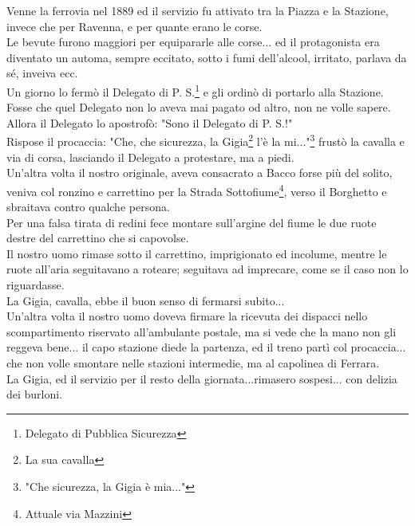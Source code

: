 Venne la ferrovia nel 1889 ed il servizio fu attivato tra la Piazza e la Stazione, invece che per Ravenna, e per quante erano le corse.\\
Le bevute furono maggiori per equipararle alle corse... ed il protagonista era diventato un automa, sempre eccitato, sotto i fumi dell'alcool, irritato, parlava da sé, inveiva ecc.\\
Un giorno lo fermò il Delegato di P. S.\footnote{Delegato di Pubblica Sicurezza} e gli ordinò di portarlo alla Stazione. Fosse che quel Delegato non lo aveva mai pagato od altro, non ne volle sapere.\\
Allora il Delegato lo apostrofò: "Sono il Delegato di P. S.!"\\
Rispose il procaccia: "Che, che sicurezza, la Gigia\footnote{La sua cavalla} l'è la mi..."\footnote{"Che sicurezza, la Gigia è mia..."} frustò la cavalla e via di corsa, lasciando il Delegato a protestare, ma a piedi.\\
Un'altra volta il nostro originale, aveva consacrato a Bacco forse più del solito, veniva col ronzino e carrettino per la Strada Sottofiume\footnote{Attuale via Mazzini}, verso il Borghetto e sbraitava contro qualche persona.\\
Per una falsa tirata di redini fece montare sull'argine del fiume le due ruote destre del carrettino che si capovolse.\\
Il nostro uomo rimase sotto il carrettino, imprigionato ed incolume, mentre le ruote all'aria seguitavano a roteare; seguitava ad imprecare, come se il caso non lo riguardasse.\\
La Gigia, cavalla, ebbe il buon senso di fermarsi subito...\\
Un'altra volta il nostro uomo doveva firmare la ricevuta dei dispacci nello scompartimento riservato all'ambulante postale, ma si vede che la mano non gli reggeva bene... il capo stazione diede la partenza, ed il treno partì col procaccia... che non volle smontare nelle stazioni intermedie, ma al capolinea di Ferrara.\\
La Gigia, ed il servizio per il resto della giornata...rimasero sospesi... con delizia dei burloni. \\

